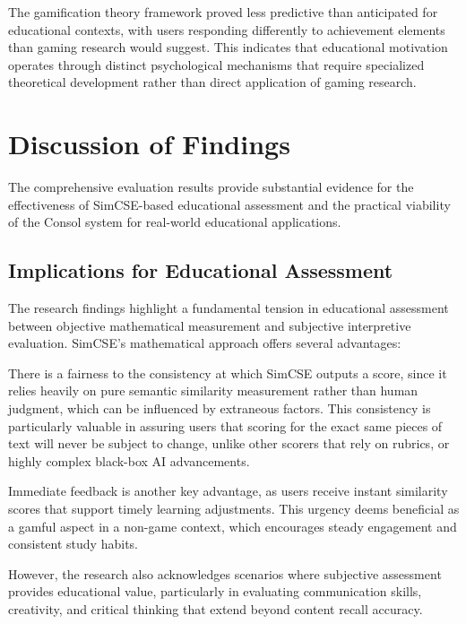 {{The gamification theory framework proved less predictive than anticipated for educational contexts, with users responding differently to achievement elements than gaming research would suggest. This indicates that educational motivation operates through distinct psychological mechanisms that require specialized theoretical development rather than direct application of gaming research.
}

{\color{maroon}
\section{Discussion of Findings}

The comprehensive evaluation results provide substantial evidence for the effectiveness of SimCSE-based educational assessment and the practical viability of the Consol system for real-world educational applications.

\subsection{Implications for Educational Assessment}



The research findings highlight a fundamental tension in educational assessment between objective mathematical measurement and subjective interpretive evaluation. SimCSE's mathematical approach offers several advantages:

There is a fairness to the consistency at which SimCSE outputs a score, since it relies heavily on pure semantic similarity measurement rather than human judgment, which can be influenced by extraneous factors. This consistency is particularly valuable in assuring users that scoring for the exact same pieces of text will never be subject to change, unlike other scorers that rely on rubrics, or highly complex black-box AI advancements.

Immediate feedback is another key advantage, as users receive instant similarity scores that support timely learning adjustments. This urgency deems beneficial as a gamful aspect in a non-game context, which encourages steady engagement and consistent study habits.


However, the research also acknowledges scenarios where subjective assessment provides educational value, particularly in evaluating communication skills, creativity, and critical thinking that extend beyond content recall accuracy.



}}
